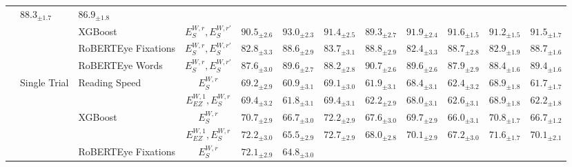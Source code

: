 \begin{table*}[ht]
{\begin{tabular}{lllc*{4}{cc}}
              & $88.3_{\pm1.7}$ & $86.9_{\pm1.8}$ \\[1ex]
      & 
          & XGBoost 
              & $E_S^{W,r},E_S^{W,r'}$ 
              & $90.5_{\pm2.6}$ & $93.0_{\pm2.3}$ 
              & $91.4_{\pm2.5}$ & $89.3_{\pm2.7}$ 
              & $91.9_{\pm2.4}$ & $91.6_{\pm1.5}$ 
              & $91.2_{\pm1.5}$ & $91.5_{\pm1.7}$ \\[1ex]
      & 
          & RoBERTEye Fixations 
              & $E_S^{W,r},E_S^{W,r'}$ 
              & $82.8_{\pm3.3}$ & $88.6_{\pm2.9}$ 
              & $83.7_{\pm3.1}$ & $88.8_{\pm2.9}$ 
              & $82.4_{\pm3.3}$ & $88.7_{\pm2.8}$ 
              & $82.9_{\pm1.9}$ & $88.7_{\pm1.6}$ \\[1ex]
      & 
          & RoBERTEye Words 
              & $E_S^{W,r},E_S^{W,r'}$ 
              & $87.6_{\pm3.0}$ & $89.6_{\pm2.7}$ 
              & $88.2_{\pm2.8}$ & $90.7_{\pm2.6}$ 
              & $89.6_{\pm2.6}$ & $87.9_{\pm2.9}$ 
              & $88.4_{\pm1.6}$ & $89.4_{\pm1.6}$ \\
    \cmidrule(lr){2-12}
      & \multirow{8}{*}{Single Trial} 
          & \multirow{2}{*}{Reading Speed} 
              & $E_S^{W,r}$ 
              & $69.2_{\pm2.9}$ & $60.9_{\pm3.1}$ 
              & $69.1_{\pm3.0}$ & $61.9_{\pm3.1}$ 
              & $68.4_{\pm3.1}$ & $62.4_{\pm3.2}$ 
              & $68.9_{\pm1.8}$ & $61.7_{\pm1.7}$ \\[1ex]
      & 
          & 
              & $E_{EZ}^{W,1},E_S^{W,r}$ 
              & $69.4_{\pm3.2}$ & $61.8_{\pm3.1}$ 
              & $69.4_{\pm3.1}$ & $62.2_{\pm2.9}$ 
              & $68.0_{\pm3.1}$ & $62.6_{\pm3.1}$ 
              & $68.9_{\pm1.8}$ & $62.2_{\pm1.8}$ \\ \cmidrule{3-12}
      & 
          & \multirow{2}{*}{XGBoost} 
              & $E_S^{W,r}$ 
              & $70.7_{\pm2.9}$ & $66.7_{\pm3.0}$ 
              & $72.2_{\pm2.9}$ & $67.6_{\pm3.0}$ 
              & $69.7_{\pm2.9}$ & $66.0_{\pm3.1}$ 
              & $70.8_{\pm1.7}$ & $66.7_{\pm1.2}$ \\[1ex]
      & 
          & 
              & $E_{EZ}^{W,1},E_S^{W,r}$ 
              & $72.2_{\pm3.0}$ & $65.5_{\pm2.9}$ 
              & $72.7_{\pm2.9}$ & $68.0_{\pm2.8}$ 
              & $70.1_{\pm2.9}$ & $67.2_{\pm3.0}$ 
              & $71.6_{\pm1.7}$ & $70.1_{\pm2.1}$ \\ \cmidrule{3-12}
      & 
          & \multirow{2}{*}{RoBERTEye Fixations}
              & $E_S^{W,r}$ 
              & $72.1_{\pm2.9}$ & $64.8_{\pm3.0}$ 

\end{tabular}}
\end{table*}
